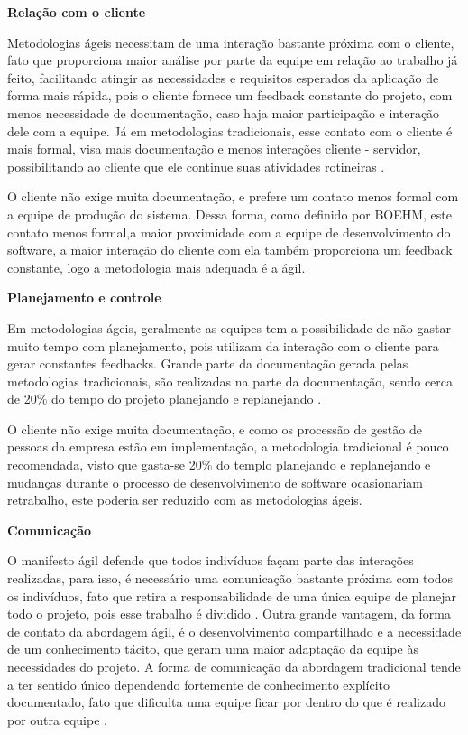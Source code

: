 \begin{description}
\item \textbf{Relação com o cliente}

Metodologias ágeis necessitam de uma interação bastante próxima com o cliente, fato que proporciona maior análise por parte da equipe em relação ao trabalho já feito, facilitando atingir as necessidades e requisitos esperados da aplicação de forma mais rápida, pois o cliente fornece um feedback constante do projeto, com menos necessidade de documentação, caso haja maior participação e interação dele com a equipe. Já em metodologias tradicionais, esse contato com o cliente é mais formal, visa mais documentação e menos interações cliente - servidor, possibilitando ao cliente que ele continue suas atividades rotineiras \cite{boehm2004}.

O cliente não exige muita documentação, e prefere um contato menos formal com a equipe de produção do sistema. Dessa forma, como definido por BOEHM, este contato menos formal,a maior proximidade com a equipe de desenvolvimento do software, a maior interação do cliente com ela também proporciona um feedback constante, logo a metodologia mais adequada é a ágil.

\item \textbf{Planejamento e controle}

Em metodologias ágeis, geralmente as equipes tem a possibilidade de não gastar muito tempo com planejamento, pois utilizam da interação com o cliente para gerar constantes feedbacks. Grande parte da documentação gerada pelas metodologias tradicionais, são realizadas na parte da documentação, sendo cerca de 20\% do tempo do projeto planejando e replanejando \cite{boehm2004}.

O cliente não exige muita documentação, e como os processão de gestão de pessoas da empresa estão em implementação, a metodologia tradicional é pouco recomendada, visto que gasta-se 20\% do templo planejando e replanejando e mudanças durante o processo de desenvolvimento de software ocasionariam retrabalho, este poderia ser reduzido com as metodologias ágeis.

\item \textbf{Comunicação}

O manifesto ágil defende que todos indivíduos façam parte das interações realizadas, para isso, é necessário uma comunicação bastante próxima com todos os indivíduos, fato que retira a responsabilidade de uma única equipe de planejar todo o projeto, pois esse trabalho é dividido \cite{agileManifest}. Outra grande vantagem, da forma de contato da abordagem ágil, é o desenvolvimento compartilhado e a necessidade de um conhecimento tácito, que geram uma maior adaptação da equipe às necessidades do projeto. A forma de comunicação da abordagem tradicional tende a ter sentido único dependendo fortemente de conhecimento explícito documentado, fato que dificulta uma equipe ficar por dentro do que é realizado por outra equipe \cite{boehm2004}.


\end{description}
